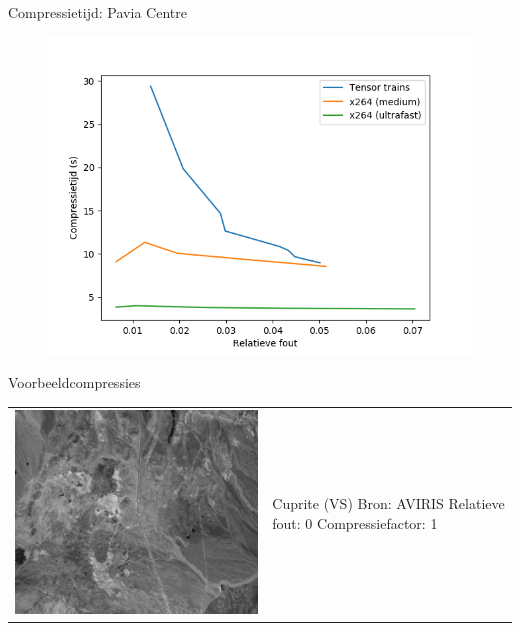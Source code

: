 \documentclass[t,12pt,dutch
\ifx\beamermode\undefined\else,\beamermode\fi
]{beamer}
\begin{document}
\begin{frame}{Compressietijd: Pavia Centre}

\begin{figure}[H]
\centering
\includegraphics[scale=0.5]{images/general_comparison_times_Pavia_Centre.png}
\end{figure}

\end{frame}

\fi

\begin{frame}{Voorbeeldcompressies}

\begin{table}[H]
\centering
\begin{tabular}{C{0.6\textwidth}  L{0.4\textwidth}}
\includegraphics[width=\linewidth]{images/cuprite_cropped_sum.png}
&
Cuprite (VS)\newline
Bron: AVIRIS\newline
\vspace{5mm}
Relatieve fout: 0
Compressiefactor: 1
\end{tabular}
\end{table}

\end{frame}
\end{document}
